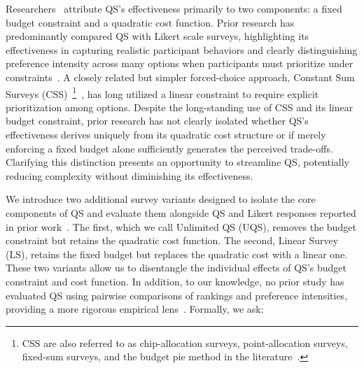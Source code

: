 
Researchers~\cite{chengCanShowWhat2021, cavaille2024cares} attribute QS's effectiveness primarily to two components: a fixed budget constraint and a quadratic cost function. Prior research has predominantly compared QS with Likert scale surveys, highlighting its effectiveness in capturing realistic participant behaviors and clearly distinguishing preference intensity across many options when participants must prioritize under constraints~\cite{chengCanShowWhat2021, cavaille2024cares}. A closely related but simpler forced-choice approach, Constant Sum Surveys (CSS)~\footnote{CSS are also referred to as chip-allocation surveys, point-allocation surveys, fixed-sum surveys, and the budget pie method in the literature~\cite{harwoodUnderstandingImplicitExplicit2019, thomas2004using, robertsWeightApproximationsMultiattribute2002, zhuSelfestimationWeightParameter1991, mciverUsingBudgetPies1976, toepoelSmileysStarsHearts2019}.}~\cite{metfesselProposalQuantitativeReporting1947}, has long utilized a linear constraint to require explicit prioritization among options. Despite the long-standing use of CSS and its linear budget constraint, prior research has not clearly isolated whether QS's effectiveness derives uniquely from its quadratic cost structure or if merely enforcing a fixed budget alone sufficiently generates the perceived trade-offs. Clarifying this distinction presents an opportunity to streamline QS, potentially reducing complexity without diminishing its effectiveness.


We introduce two additional survey variants designed to isolate the core components of QS and evaluate them alongside QS and Likert responses reported in prior work~\cite{chengCanShowWhat2021}. The first, which we call Unlimited QS (UQS), removes the budget constraint but retains the quadratic cost function. The second, Linear Survey (LS), retains the fixed budget but replaces the quadratic cost with a linear one. These two variants allow us to disentangle the individual effects of QS's budget constraint and cost function. In addition, to our knowledge, no prior study has evaluated QS using pairwise comparisons of rankings and preference intensities, providing a more rigorous empirical lens~\cite{collewet2023preference}. Formally, we ask:

